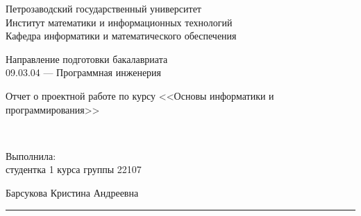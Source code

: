 \documentclass[a4paper,12pt]{article}
\newcommand{\myrule}[1]{\rule{#1}{0.4pt}}
\newcommand{\sign}[2][~]{{\small\myrule{#2}\\[-0.7em]\makebox[#2]{\it #1}}}
\renewcommand{\baselinestretch}{1.50}
\begin{document}

\thispagestyle{empty}
\begin{center}


    \renewcommand{\baselinestretch}{1}
    {\large
        {\sc Петрозаводский государственный университет\\
            Институт математики и информационных технологий\\
            Кафедра информатики и математического обеспечения
        }
    }

\end{center}


\begin{center}
    Направление подготовки бакалавриата \\
    09.03.04 --- Программная инженерия \\
\end{center}

\vfill

\begin{center}

    {\normalsize
        Отчет о проектной работе по курсу <<Основы информатики и программирования>>}
    \medskip

    {\Large {}} \\
\end{center}

\medskip

\begin{flushright}
    \parbox{11cm}{%
        \renewcommand{\baselinestretch}{1.2}
        \normalsize
        Выполнила:\\
        студентка 1 курса группы 22107
        \begin{flushright}
            Барсукова Кристина Андреевна \sign[подпись]{4cm}
        \end{flushright}


    }
\end{flushright}
\end{document}
